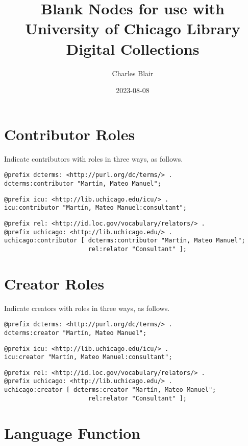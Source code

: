 \documentclass[11pt]{article}
\date{2023-08-08}
\title{Blank Nodes for use with University of Chicago Library Digital Collections}
\author{Charles Blair}
\begin{document}
\maketitle

\section{Contributor Roles}
Indicate contributors with roles in three ways, as follows.

\begin{verbatim}
@prefix dcterms: <http://purl.org/dc/terms/> .
dcterms:contributor "Martín, Mateo Manuel";
\end{verbatim}

\begin{verbatim}
@prefix icu: <http://lib.uchicago.edu/icu/> .
icu:contributor "Martín, Mateo Manuel:consultant";
\end{verbatim}

\begin{verbatim}
@prefix rel: <http://id.loc.gov/vocabulary/relators/> .
@prefix uchicago: <http://lib.uchicago.edu/> .
uchicago:contributor [ dcterms:contributor "Martín, Mateo Manuel";
                       rel:relator "Consultant" ];
\end{verbatim}

\section{Creator Roles}
Indicate creators with roles in three ways, as follows.

\begin{verbatim}
@prefix dcterms: <http://purl.org/dc/terms/> .
dcterms:creator "Martín, Mateo Manuel";
\end{verbatim}

\begin{verbatim}
@prefix icu: <http://lib.uchicago.edu/icu/> .
icu:creator "Martín, Mateo Manuel:consultant";
\end{verbatim}

\begin{verbatim}
@prefix rel: <http://id.loc.gov/vocabulary/relators/> .
@prefix uchicago: <http://lib.uchicago.edu/> .
uchicago:creator [ dcterms:creator "Martín, Mateo Manuel";
                       rel:relator "Consultant" ];
\end{verbatim}

\section{Language Function}
\end{document}
